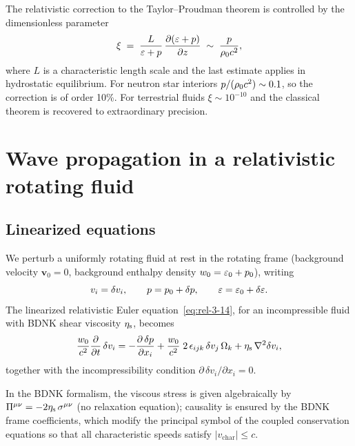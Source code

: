 \begin{relcorrection}
The relativistic correction to the Taylor--Proudman theorem is
controlled by the dimensionless parameter
\begin{equation}\label{eq:rel-3-19}
  \xi
  \;=\;
  \frac{L}{\varepsilon + p}
  \,\frac{\partial(\varepsilon + p)}{\partial z}
  \;\sim\;
  \frac{p}{\rho_0 c^{2}},
\end{equation}
where $L$ is a characteristic length scale and the last estimate
applies in hydrostatic equilibrium.  For neutron star interiors
$p/(\rho_0 c^{2}) \sim 0.1$, so the correction is of order 10\%.
For terrestrial fluids $\xi \sim 10^{-10}$ and the classical theorem
is recovered to extraordinary precision.
\end{relcorrection}


\section{Wave propagation in a relativistic rotating fluid}
\label{sec:rel-3-23}

\subsection{Linearized equations}

We perturb a uniformly rotating fluid at rest in the rotating frame
(background velocity $\mathbf{v}_{0} = 0$, background enthalpy density
$w_{0} = \varepsilon_{0}+p_{0}$), writing
\begin{equation}\label{eq:rel-3-20}
  v_{i} = \delta v_{i},
  \qquad
  p = p_{0} + \delta p,
  \qquad
  \varepsilon = \varepsilon_{0} + \delta\varepsilon.
\end{equation}
The linearized relativistic Euler equation~\eqref{eq:rel-3-14}, for an
incompressible fluid with BDNK shear viscosity $\eta_{\mathrm{s}}$, becomes
\begin{equation}\label{eq:rel-3-21}
  \frac{w_{0}}{c^{2}}
  \frac{\partial}{\partial t}\,\delta v_{i}
  =
  -\frac{\partial\,\delta p}{\partial x_{i}}
  + \frac{w_{0}}{c^{2}}\;
    2\,\epsilon_{ijk}\,\delta v_{j}\,\Omega_{k}
  + \eta_{\mathrm{s}}\,\nabla^{2}\delta v_{i},
\end{equation}
together with the incompressibility condition
$\partial\,\delta v_{i}/\partial x_{i} = 0$.

In the BDNK formalism, the viscous stress is given algebraically by
$\Pi^{\mu\nu} = -2\eta_{\mathrm{s}}\,\sigma^{\mu\nu}$ (no relaxation
equation); causality is ensured by the BDNK frame coefficients, which
modify the principal symbol of the coupled conservation equations so
that all characteristic speeds satisfy $|v_{\mathrm{char}}| \leq c$.

